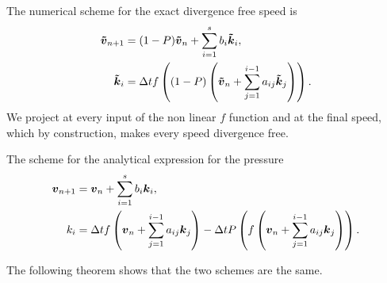 The numerical scheme for the exact divergence free speed is
\begin{subequations}
\begin{align}
{\boldsymbol {\tilde{v}}}_{n+1}&=(1-P){\boldsymbol {\tilde{v}}}_{n}+\sum_{i=1}^{s}b_{i}{\boldsymbol {\tilde{k}}}_{i},\\
{\boldsymbol {\tilde{k}}}_{i}&=\Delta t f\left((1-P)\left({\boldsymbol {\tilde{v}}}_{n}+\sum_{j=1}^{i-1}a_{ij}{\boldsymbol {\tilde{k}}}_{j}\right)\right).
\end{align}
\end{subequations}
We project at every input of the non linear $f$ function and at the final speed, which by construction, makes every speed divergence free.

The scheme for the analytical expression for the pressure
\begin{subequations}
\begin{align}
	{\boldsymbol {v}}_{n+1}&={\boldsymbol {v}}_{n}+\sum_{i=1}^{s}b_{i}{\boldsymbol {k}}_{i},\\
	k_{i}&=\Delta t f\left({\boldsymbol {v}}_{n}+\sum_{j=1}^{i-1}a_{ij}{\boldsymbol {k}}_{j}\right)-\Delta t P\left(f\left({\boldsymbol {v}}_{n}+\sum_{j=1}^{i-1}a_{ij}{\boldsymbol {k}}_{j}\right)\right).
\end{align}
\end{subequations}

The following theorem shows that the two schemes are the same.

